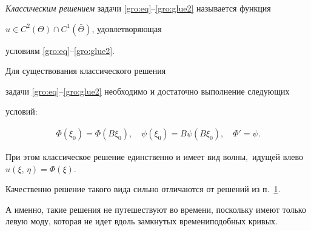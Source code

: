 


\smallskip



\begin{definition}[2.1]\textit{Классическим решением} задачи \eqref{gro:eq}--\eqref{gro:glue2} называется \linebreak функция

$u \in C^2(\Theta) \cap C^1 (\bar\Theta)$, удовлетворяющая

условиям \eqref{gro:eq}--\eqref{gro:glue2}.

\end{definition}



\smallskip



\begin{theorem}[2.1]Для существования классического решения

задачи \eqref{gro:eq}--\eqref{gro:glue2} необходимо и достаточно выполнение следующих

условий{\rm:}

\begin{gather*}


\Phi(\xi_0) = \Phi(B \xi_0),\quad 


\psi(\xi_0) = B\psi(B \xi_0),\quad 


\Phi' = \psi.

\end{gather*}

При этом классическое решение единственно и имеет вид волны$,$ идущей влево $u(\xi,\,\eta) = \Phi(\xi).$

\end{theorem}



\smallskip



\begin{remark}[2.1]Качественно решение такого вида сильно отличаются от решений из п.~\hyperlink{grosh:1}{1}.

А именно, такие решения не путешествуют во времени, поскольку имеют только левую моду, которая не идет вдоль замкнутых времениподобных кривых.

\end{remark}



